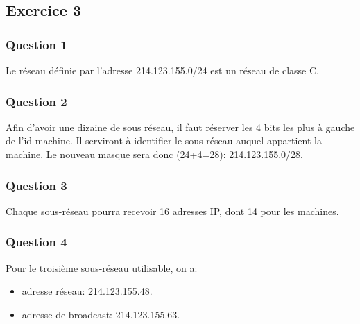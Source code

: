 \subsection{Exercice 3}
\subsubsection{Question 1}
Le réseau définie par l'adresse 214.123.155.0/24 est un réseau de classe C.
\subsubsection{Question 2}
Afin d'avoir une dizaine de sous réseau, il faut réserver les 4 bits les plus à gauche de
l'id machine. Il serviront à identifier le sous-réseau auquel appartient la machine.
Le nouveau masque sera donc (24+4=28): 214.123.155.0/28.
\subsubsection{Question 3}
Chaque sous-réseau pourra recevoir 16 adresses IP, dont 14 pour les machines.
\subsubsection{Question 4}
Pour le troisième sous-réseau utilisable, on a:
\begin{itemize}
	\item adresse réseau: 214.123.155.48.
	\item adresse de broadcast: 214.123.155.63.
\end{itemize}


